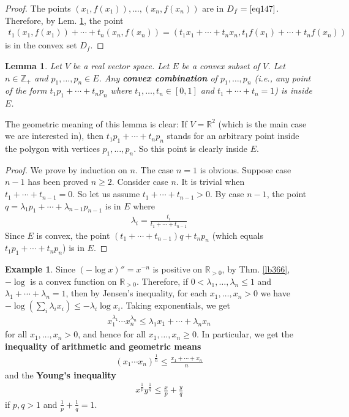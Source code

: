 \documentclass[12pt,b5paper,notitlepage]{article}
\theoremstyle{definition}
\newtheorem{eg}[df]{Example}
\theoremstyle{plain}
\newtheorem{lm}[df]{Lemma}
\newcommand{\Zbb}{\mathbb Z}
\newcommand{\Rbb}{\mathbb R}
\numberwithin{equation}{section}
\begin{document}
\begin{proof}
The points $(x_1,f(x_1)),\dots,(x_n,f(x_n))$ are in $D_f=\eqref{eq147}$. Therefore, by Lem. \ref{lb365}, the point
\begin{align*}
t_1(x_1,f(x_1))+\cdots+t_n(x_n,f(x_n))=(t_1x_1+\cdots+t_nx_n,t_1f(x_1)+\cdots+t_nf(x_n))
\end{align*}
is in the convex set $D_f$. 
\end{proof}



\begin{lm}\label{lb365}
Let $V$ be a real vector space. Let $E$ be a convex subset of $V$. Let $n\in\Zbb_+$ and $p_1,\dots,p_n\in E$. Any \textbf{convex combination} of $p_1,\dots,p_n$  (i.e., any point of the form $t_1p_1+\cdots+t_np_n$ where $t_1,\dots,t_n\in[0,1]$ and $t_1+\cdots+t_n=1$) is inside $E$.
\end{lm}

The geometric meaning of this lemma is clear: If $V=\Rbb^2$ (which is the main case we are interested in), then $t_1p_1+\cdots+t_np_n$ stands for an arbitrary point inside the polygon with vertices $p_1,\dots,p_n$. So this point is clearly inside $E$.


\begin{proof}
We prove by induction on $n$. The case $n=1$ is obvious. Suppose case $n-1$ has been proved $n\geq 2$. Consider case $n$. It is trivial when $t_1+\cdots+t_{n-1}=0$. So let us assume $t_1+\cdots+t_{n-1}>0$. By case $n-1$, the point $q=\lambda_1 p_1+\cdots+\lambda_{n-1}p_{n-1}$ is in $E$ where
\begin{align*}
\lambda_i=\frac{t_i}{t_1+\cdots+t_{n-1}}
\end{align*}
Since $E$ is convex, the point $(t_1+\cdots+t_{n-1})q+t_np_n$ (which equals $t_1p_1+\cdots+t_np_n$) is in $E$.
\end{proof}


\begin{eg}
Since $(-\log x)''=x^{-n}$ is positive on $\Rbb_{>0}$, by Thm. \ref{lb366}, $-\log$ is a convex function on $\Rbb_{>0}$. Therefore, if $0<\lambda_1,\dots,\lambda_n\leq 1$ and $\lambda_1+\cdots+\lambda_n=1$, then by Jensen's inequality, for each $x_1,\dots,x_n>0$ we have $-\log(\sum_i\lambda_ix_i)\leq -\lambda_i\log x_i$. Taking exponentials, we get
\begin{align*}
x_1^{\lambda_1}\cdots x_n^{\lambda_n}\leq \lambda_1x_1+\cdots+\lambda_n x_n
\end{align*}
for all $x_1,\dots,x_n>0$, and hence for all $x_1,\dots,x_n\geq0$. In particular, we get the \textbf{inequality of arithmetic and geometric means}
\begin{align}
(x_1\cdots x_n)^{\frac 1n}\leq \frac{x_1+\cdots+x_n}{n}
\end{align}
and the \textbf{Young's inequality} 
\begin{align}
x^{\frac 1p}y^{\frac 1q}\leq \frac xp+\frac yq
\end{align}
if $p,q>1$ and $\frac 1p+\frac 1q=1$.
\end{eg}
\end{document}
